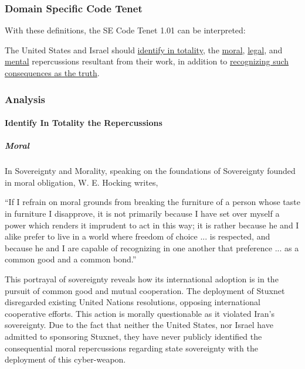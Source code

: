 \documentclass[12pt]{article}
\begin{document}
\begin{multicols}{2}
\subsubsection{Domain Specific Code Tenet}

With these definitions, the SE Code Tenet 1.01 can be interpreted:
\begin{framed}
The United States and Israel should \ul{identify in totality}, the \ul{moral}, \ul{legal}, and \ul{mental} repercussions resultant from their work, in addition to \ul{recognizing such consequences as the truth}.
\end{framed}

\subsubsection{Analysis}

\paragraph{Identify In Totality the Repercussions}

\subparagraph{Moral}

In Sovereignty and Morality, speaking on the foundations of Sovereignty founded in moral obligation, W. E. Hocking writes,

\begin{displayquote}
``If I refrain on moral grounds from breaking the furniture of a person whose taste in furniture I disapprove, it is not primarily because I have set over myself a power which renders it imprudent to act in this way; it is rather because he and I alike prefer to live in a world where freedom of choice ... is respected, and because he and I are capable of recognizing in one another that preference ... as a common good and a common bond.''\cite{soverigntyAndMoralObligation}
\end{displayquote}

This portrayal of sovereignty reveals how its international adoption is in the pursuit of common good and mutual cooperation. The deployment of Stuxnet disregarded existing United Nations resolutions, opposing international cooperative efforts.\cite{resolution1747} This action is morally questionable as it violated Iran's sovereignty. Due to the fact that neither the United States, nor Israel have admitted to sponsoring Stuxnet, they have never publicly identified the consequential moral repercussions regarding state sovereignty with the deployment of this cyber-weapon.


\end{multicols}
\end{document}
